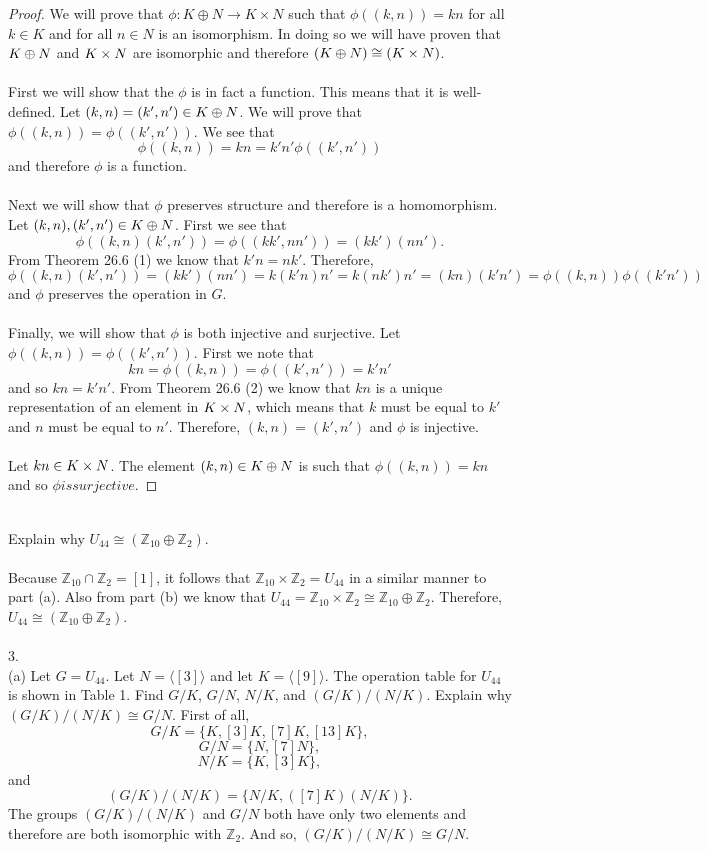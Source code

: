 \documentclass[11pt]{article}
\begin{document}
\begin{proof}
We will prove that $\phi: K \oplus N \rightarrow K \times N$ such that $\phi((k,n)) = kn$ for all $k\in K$ and for all $n\in N$ is an isomorphism. In doing so we will have proven that $K \oplus N$ and $K \times N$ are isomorphic and therefore $ (K \oplus N) \cong (K \times N) $.\\
~\\
First we will show that the $\phi$ is in fact a function. This means that it is well-defined. Let $(k,n) = (k',n') \in K \oplus N$. We will prove that $\phi((k,n)) = \phi((k',n'))$. We see that
\[ \phi((k,n)) = kn = k'n' \phi((k',n')) \]
and therefore $\phi$ is a function.\\
~\\
Next we will show that $\phi$ preserves structure and therefore is a homomorphism. Let $(k,n),(k',n')\in K \oplus N$. First we see that 
\[ \phi((k,n)(k',n')) = \phi((kk',nn')) = (kk')(nn'). \]
From Theorem 26.6 (1) we know that $k'n=nk'$. Therefore,
\[ \phi((k,n)(k',n')) = (kk')(nn') = k(k'n)n' = k(nk')n' = (kn)(k'n') = \phi((k,n))\phi((k'n')) \]
and $\phi$ preserves the operation in $G$.\\
~\\
Finally, we will show that $\phi$ is both injective and surjective. Let $\phi((k,n)) = \phi((k',n'))$. First we note that
\[ kn = \phi((k,n)) = \phi((k',n')) = k'n' \]
and so $kn=k'n'$. From Theorem 26.6 (2) we know that $kn$ is a unique representation of an element in $K \times N$, which means that $k$ must be equal to $k'$ and $n$ must be equal to $n'$. Therefore, $(k,n) = (k',n')$ and $\phi$ is injective.\\
~\\
Let $kn\in K \times N$. The element $(k,n)\in K \oplus N$ is such that $\phi((k,n))=kn$ and so $\phi is surjective$.
\end{proof}
~\\
Explain why $U_{44} \cong (\mathbb{Z}_{10} \oplus \mathbb{Z}_2)$.\\
~\\
Because $\mathbb{Z}_{10} \cap \mathbb{Z}_2 = [1]$, it follows that
 $\mathbb{Z}_{10} \times \mathbb{Z}_2 = U_{44}$ in a similar manner to part (a). Also from part (b) we know that $U_{44} = \mathbb{Z}_{10} \times \mathbb{Z}_2 \cong \mathbb{Z}_{10} \oplus \mathbb{Z}_2$. 
Therefore, $U_{44} \cong (\mathbb{Z}_{10} \oplus \mathbb{Z}_2)$.\\
~\\
3.\\
(a) Let $G= U_{44}$. Let $N = \langle [3] \rangle$ and let $K=\langle [9] \rangle$. The operation table for $U_{44}$ is shown in Table 1. Find $G/K$, $G/N$, $N/K$, and $(G/K)/(N/K)$. Explain why $(G/K)/(N/K) \cong G/N$.
First of all,
\[ G/K = \{K, [3]K, [7]K, [13]K\},\]
\[ G/N = \{N, [7]N\}, \]
\[ N/K = \{K, [3]K\},\]
and
\[(G/K)/(N/K) = \{ N/K, ([7]K)(N/K) \}.\]
The groups $(G/K)/(N/K)$ and $G/N$ both have only two elements and therefore are both isomorphic with $\mathbb{Z}_2$. And so, $(G/K)/(N/K) \cong G/N$.
\end{document}
